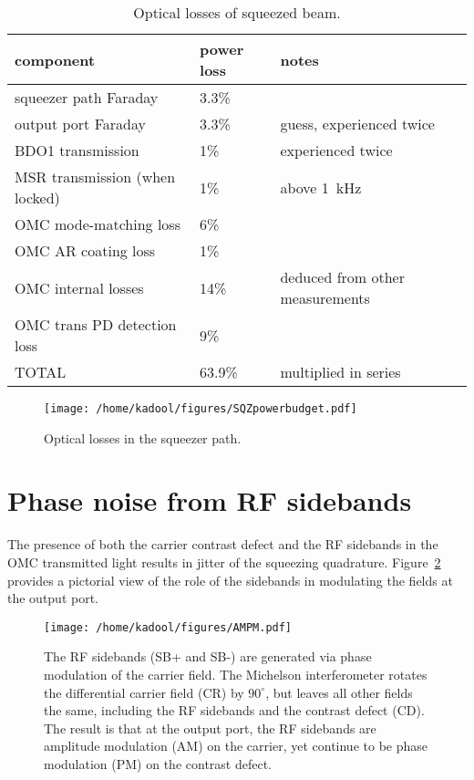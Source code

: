 \documentclass{ligodoc}
\begin{document}
\begin{table}
\centering
\caption{Optical losses of squeezed beam.}
\begin{tabular}{l l l} %
\hline
component & power loss & notes \\
\hline
squeezer path Faraday & 3.3\% & \\
output port Faraday & 3.3\% & guess, experienced twice \\
BDO1 transmission & 1\% & experienced twice \\
MSR transmission (when locked) & 1\% & above 1~kHz \\
OMC mode-matching loss & 6\% & \\
OMC AR coating loss & 1\% & \\
OMC internal losses & 14\% & deduced from other measurements \\ 
OMC trans PD detection loss & 9\% & \\
\hline
TOTAL & 63.9\% & multiplied in series \\
\hline
\end{tabular}
\label{tab:losses}
\end{table}


\begin{figure}
\begin{centering}
\texttt{[image: /home/kadool/figures/SQZpowerbudget.pdf]}
\caption{Optical losses in the squeezer path.}
\label{fig:powerbudget}
\end{centering}
\end{figure}



\section{Phase noise from RF sidebands}
The presence of both the carrier contrast defect and the RF sidebands
in the OMC transmitted light results in jitter of the squeezing
quadrature. Figure~\ref{fig:AMPM} provides a pictorial view of the
role of the sidebands in modulating the fields at the output port. 

\begin{figure}
\begin{centering}
\texttt{[image: /home/kadool/figures/AMPM.pdf]}
\caption{The RF sidebands (SB+ and SB-) are generated via phase
  modulation of the carrier field. The Michelson interferometer
  rotates the differential carrier field (CR) by $90^\circ$, but leaves
  all other fields the same, including the RF sidebands and the
  contrast defect (CD). The result is that at the output port, the RF
  sidebands are amplitude modulation (AM) on the carrier, yet continue
  to be phase modulation (PM) on the contrast defect.}
\label{fig:AMPM}
\end{centering}
\end{figure}
\end{document}
